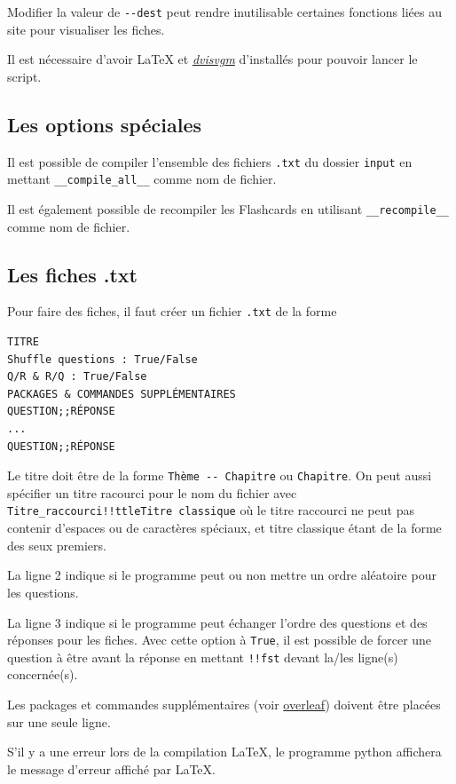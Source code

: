 \documentclass[a4paper,12pt]{article}
\begin{document}
Modifier la valeur de \texttt{-{}-dest} peut rendre inutilisable certaines fonctions liées au site pour visualiser les fiches.

Il est nécessaire d'avoir \LaTeX{} et \href{https://ctan.org/pkg/dvisvgm/}{\color{black}\textsl{dvisvgm}} d'installés pour pouvoir lancer le script.
\subsection{Les options spéciales}
Il est possible de compiler l'ensemble des fichiers \texttt{.txt} du dossier \texttt{input} en mettant \texttt{\_\_compile\_all\_\_} comme nom de fichier.

Il est également possible de recompiler les Flashcards en utilisant \texttt{\_\_recompile\_\_} comme nom de fichier.
\subsection{Les fiches .txt}
Pour faire des fiches, il faut créer un fichier \texttt{.txt} de la forme
\vspace{-\abovedisplayskip}\begin{verbatim}
TITRE
Shuffle questions : True/False
Q/R & R/Q : True/False
PACKAGES & COMMANDES SUPPLÉMENTAIRES
QUESTION;;RÉPONSE
...
QUESTION;;RÉPONSE
\end{verbatim}
\vspace{-\belowdisplayskip}

Le titre doit être de la forme \texttt{Thème -{}- Chapitre} ou \texttt{Chapitre}.
On peut aussi spécifier un titre racourci pour le nom du fichier avec \texttt{Titre\_raccourci!!ttleTitre classique} où le titre raccourci ne peut pas contenir d'espaces ou de caractères spéciaux, et titre classique étant de la forme des seux premiers.

La ligne 2 indique si le programme peut ou non mettre un ordre aléatoire pour les questions.

La ligne 3 indique si le programme peut échanger l'ordre des questions et des réponses pour les fiches. Avec cette option à \texttt{True}, il est possible de forcer une question à être avant la réponse en mettant \texttt{!!fst} devant la/les ligne(s) concernée(s).

Les packages et commandes supplémentaires (voir \href{https://www.overleaf.com/learn/latex/Commands}{overleaf}) doivent être placées sur une seule ligne.

S'il y a une erreur lors de la compilation \LaTeX, le programme python affichera le message d'erreur affiché par \LaTeX.
\end{document}
